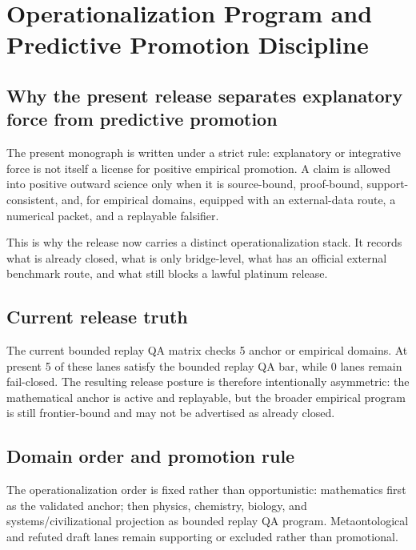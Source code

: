\section{Operationalization Program and Predictive Promotion Discipline}
\label{sec:oc-core-1-3-operationalization-program}

\subsection{Why the present release separates explanatory force from predictive promotion}
\label{sec:oc13-prediction-claim-taxonomy-v3}
The present monograph is written under a strict rule: explanatory or integrative force is not itself a license for positive empirical promotion.
A claim is allowed into positive outward science only when it is source-bound, proof-bound, support-consistent, and, for empirical domains, equipped with an external-data route, a numerical packet, and a replayable falsifier.

This is why the release now carries a distinct operationalization stack. It records what is already closed, what is only bridge-level, what has an official external benchmark route, and what still blocks a lawful platinum release.

\subsection{Current release truth}
The current bounded replay QA matrix checks 5 anchor or empirical domains.
At present 5 of these lanes satisfy the bounded replay QA bar, while 0 lanes remain fail-closed.
The resulting release posture is therefore intentionally asymmetric: the mathematical anchor is active and replayable, but the broader empirical program is still frontier-bound and may not be advertised as already closed.

\subsection{Domain order and promotion rule}
The operationalization order is fixed rather than opportunistic: mathematics first as the validated anchor; then physics, chemistry, biology, and systems/civilizational projection as bounded replay QA program. Metaontological and refuted draft lanes remain supporting or excluded rather than promotional.

